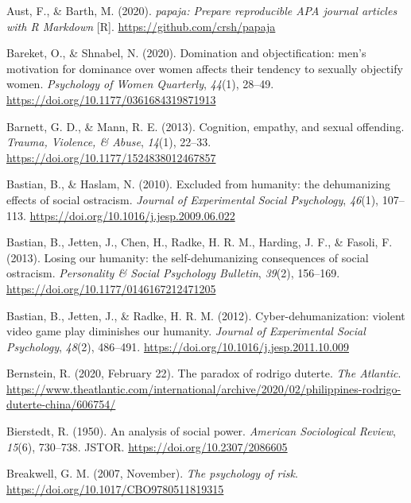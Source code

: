\documentclass[
  donotrepeattitle,doc, 12pt, a4paper,floatsintext]{apa7}
\newlength{\cslhangindent}
\newlength{\cslentryspacingunit} %
\newenvironment{CSLReferences}[2] %
 {%
  \setlength{\parindent}{0pt}
  \ifodd #1
  \let\oldpar\par
  \def\par{\hangindent=\cslhangindent\oldpar}
  \fi
  \setlength{\parskip}{#2\cslentryspacingunit}
 }%
 {}
\begin{document}
\begin{CSLReferences}{1}{0}
\leavevmode{}%
Aust, F., \& Barth, M. (2020). \emph{papaja: Prepare reproducible APA journal articles with R Markdown} {[}R{]}. \url{https://github.com/crsh/papaja}

\leavevmode{}%
Bareket, O., \& Shnabel, N. (2020). Domination and objectification: men's motivation for dominance over women affects their tendency to sexually objectify women. \emph{Psychology of Women Quarterly}, \emph{44}(1), 28--49. \url{https://doi.org/10.1177/0361684319871913}

\leavevmode{}%
Barnett, G. D., \& Mann, R. E. (2013). Cognition, empathy, and sexual offending. \emph{Trauma, Violence, \& Abuse}, \emph{14}(1), 22--33. \url{https://doi.org/10.1177/1524838012467857}

\leavevmode{}%
Bastian, B., \& Haslam, N. (2010). Excluded from humanity: the dehumanizing effects of social ostracism. \emph{Journal of Experimental Social Psychology}, \emph{46}(1), 107--113. \url{https://doi.org/10.1016/j.jesp.2009.06.022}

\leavevmode{}%
Bastian, B., Jetten, J., Chen, H., Radke, H. R. M., Harding, J. F., \& Fasoli, F. (2013). Losing our humanity: the self-dehumanizing consequences of social ostracism. \emph{Personality \& Social Psychology Bulletin}, \emph{39}(2), 156--169. \url{https://doi.org/10.1177/0146167212471205}

\leavevmode{}%
Bastian, B., Jetten, J., \& Radke, H. R. M. (2012). Cyber-dehumanization: violent video game play diminishes our humanity. \emph{Journal of Experimental Social Psychology}, \emph{48}(2), 486--491. \url{https://doi.org/10.1016/j.jesp.2011.10.009}

\leavevmode{}%
Bernstein, R. (2020, February 22). The paradox of rodrigo duterte. \emph{The Atlantic}. \url{https://www.theatlantic.com/international/archive/2020/02/philippines-rodrigo-duterte-china/606754/}

\leavevmode{}%
Bierstedt, R. (1950). An analysis of social power. \emph{American Sociological Review}, \emph{15}(6), 730--738. JSTOR. \url{https://doi.org/10.2307/2086605}

\leavevmode{}%
Breakwell, G. M. (2007, November). \emph{The psychology of risk}. \url{https://doi.org/10.1017/CBO9780511819315}


\end{CSLReferences}
\end{document}

